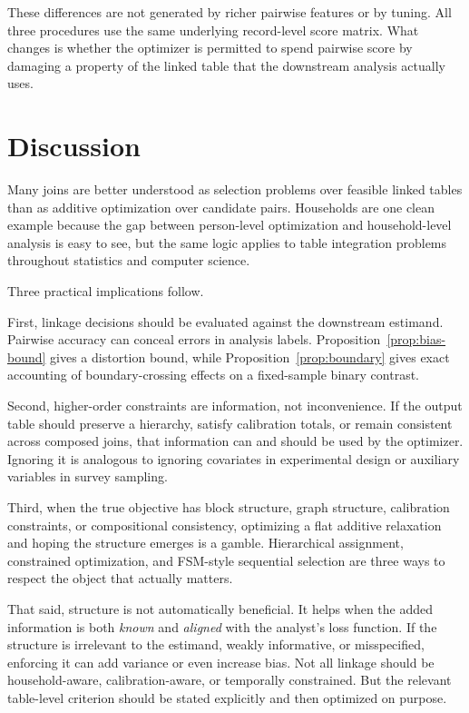 \documentclass[11pt]{article}
\theoremstyle{remark}
\begin{document}
These differences are not generated by richer pairwise features or by tuning. All three procedures use the same underlying record-level score matrix. What changes is whether the optimizer is permitted to spend pairwise score by damaging a property of the linked table that the downstream analysis actually uses.

\section{Discussion}

Many joins are better understood as selection problems over feasible linked tables than as additive optimization over candidate pairs. Households are one clean example because the gap between person-level optimization and household-level analysis is easy to see, but the same logic applies to table integration problems throughout statistics and computer science.

Three practical implications follow.

First, linkage decisions should be evaluated against the downstream estimand. Pairwise accuracy can conceal errors in analysis labels. Proposition~\ref{prop:bias-bound} gives a distortion bound, while Proposition~\ref{prop:boundary} gives exact accounting of boundary-crossing effects on a fixed-sample binary contrast.

Second, higher-order constraints are information, not inconvenience. If the output table should preserve a hierarchy, satisfy calibration totals, or remain consistent across composed joins, that information can and should be used by the optimizer. Ignoring it is analogous to ignoring covariates in experimental design or auxiliary variables in survey sampling.

Third, when the true objective has block structure, graph structure, calibration constraints, or compositional consistency, optimizing a flat additive relaxation and hoping the structure emerges is a gamble. Hierarchical assignment, constrained optimization, and FSM-style sequential selection are three ways to respect the object that actually matters.

That said, structure is not automatically beneficial. It helps when the added information is both \emph{known} and \emph{aligned} with the analyst's loss function. If the structure is irrelevant to the estimand, weakly informative, or misspecified, enforcing it can add variance or even increase bias. Not all linkage should be household-aware, calibration-aware, or temporally constrained. But the relevant table-level criterion should be stated explicitly and then optimized on purpose.
\end{document}
